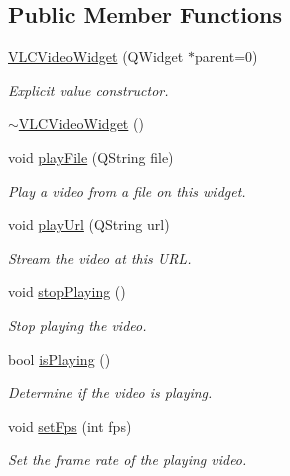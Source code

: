 \subsection*{Public Member Functions}
\begin{DoxyCompactItemize}
\item 
\hyperlink{classVLCVideoWidget_a2ee422ecbf1d7c6a09c8c08461ae8f0d}{V\-L\-C\-Video\-Widget} (Q\-Widget $\ast$parent=0)
\begin{DoxyCompactList}\small\item\em Explicit value constructor. \end{DoxyCompactList}\item 
\hyperlink{classVLCVideoWidget_a2ad9c4a037fdb833b1b1f9ba71075d86}{$\sim$\-V\-L\-C\-Video\-Widget} ()
\item 
void \hyperlink{classVLCVideoWidget_a7eb5395abd53f19c012fea779b6bac1e}{play\-File} (Q\-String file)
\begin{DoxyCompactList}\small\item\em Play a video from a file on this widget. \end{DoxyCompactList}\item 
void \hyperlink{classVLCVideoWidget_a1119aa3a41789fc1f4abe834e36c64df}{play\-Url} (Q\-String url)
\begin{DoxyCompactList}\small\item\em Stream the video at this U\-R\-L. \end{DoxyCompactList}\item 
void \hyperlink{classVLCVideoWidget_aefa842a30cbb11522428597c1f0608a0}{stop\-Playing} ()
\begin{DoxyCompactList}\small\item\em Stop playing the video. \end{DoxyCompactList}\item 
bool \hyperlink{classVLCVideoWidget_a45fd49c0a63d1eeeaaff78ffd208ddad}{is\-Playing} ()
\begin{DoxyCompactList}\small\item\em Determine if the video is playing. \end{DoxyCompactList}\item 
void \hyperlink{classVLCVideoWidget_a5fce57e1a69fd7371c7e0950d5bb14a8}{set\-Fps} (int fps)
\begin{DoxyCompactList}\small\item\em Set the frame rate of the playing video. \end{DoxyCompactList}\item 

\end{DoxyCompactItemize}
